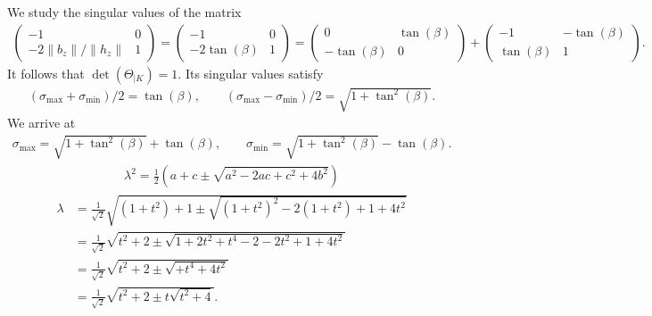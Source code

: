 \documentclass[10pt,a4paper]{article}
\begin{document}
        \color{blue}
        We study the singular values of the matrix 
        \begin{align*}
            \begin{pmatrix}
            -1                 & 0
            \\ 
            -2 \|b_z\|/\|h_z\| & 1
            \end{pmatrix}
            =
            \begin{pmatrix}
            -1             & 0
            \\ 
            -2 \tan(\beta) & 1
            \end{pmatrix}
            =
            \begin{pmatrix}
            0             & \tan(\beta)
             \\ 
            -\tan(\beta) & 0
            \end{pmatrix}
            +
            \begin{pmatrix}
            -1           & -\tan(\beta)
             \\ 
            \tan(\beta) & 1
            \end{pmatrix}
            .
        \end{align*}
        It follows that $\det(\Theta_{|K}) = 1$. 
        Its singular values satisfy 
        \begin{align*}
            ( \sigma_{\max} + \sigma_{\min} )/2
            =
            \tan(\beta)
            ,
            \qquad 
            ( \sigma_{\max} - \sigma_{\min} )/2
            =
            \sqrt{ 1 + \tan^{2}(\beta) }
            .
        \end{align*}
        We arrive at 
        \begin{align*}
            \sigma_{\max} = \sqrt{ 1 + \tan^{2}(\beta) } + \tan(\beta)
            ,
            \qquad 
            \sigma_{\min} = \sqrt{ 1 + \tan^{2}(\beta) } - \tan(\beta)
            .
        \end{align*}
\begin{align*}
    \lambda^2 = \frac{1}{2} \left( a + c \pm \sqrt{ a^2 - 2 a c + c^2 + 4b^2 } \right)
\end{align*}
\begin{align*}
    \lambda 
    &= 
    \frac{1}{\sqrt 2} \sqrt{ (1+t^2) + 1 \pm \sqrt{ (1+t^2)^2 - 2 (1+t^2)   +   1 + 4t^2 } } 
    \\
    &= 
    \frac{1}{\sqrt 2} \sqrt{ t^2 + 2 \pm \sqrt{ 1 + 2t^2 + t^4 - 2 - 2 t^2 + 1 + 4t^2 } } 
    \\
    &= 
    \frac{1}{\sqrt 2} \sqrt{ t^2 + 2 \pm \sqrt{          + t^4                 + 4t^2 } } 
    \\
    &= 
    \frac{1}{\sqrt 2} \sqrt{ t^2 + 2 \pm t \sqrt{ t^2 + 4 } } 
    .
\end{align*}
\end{document}
